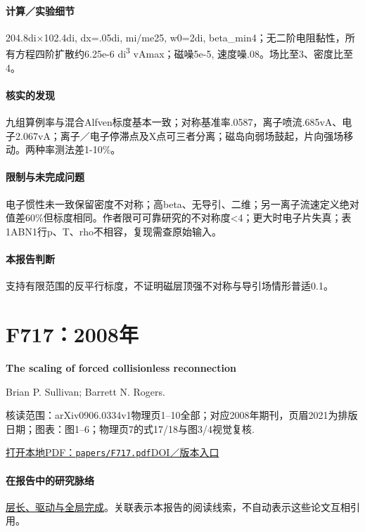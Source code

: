 \documentclass[UTF8,a4paper,11pt,openany,fontset=fandol]{ctexbook}
\begin{document}
\paragraph{计算／实验细节}204.8di×102.4di, dx=.05di, mi/me25, w0=2di, beta\_min4；无二阶电阻黏性，所有方程四阶扩散约6.25e-6 di\textsuperscript{3} vAmax；磁噪5e-5, 速度噪.08。场比至3、密度比至4。

\paragraph{核实的发现}九组算例率与混合Alfven标度基本一致；对称基准率.0587，离子喷流.685vA、电子2.067vA；离子／电子停滞点及X点可三者分离；磁岛向弱场鼓起，片向强场移动。两种率测法差1-10\%。

\paragraph{限制与未完成问题}电子惯性未一致保留密度不对称；高beta、无导引、二维；另一离子流速定义绝对值差60\%但标度相同。作者限可可靠研究的不对称度<4；更大时电子片失真；表1ABN1行p、T、rho不相容，复现需查原始输入。

\paragraph{本报告判断}支持有限范围的反平行标度，不证明磁层顶强不对称与导引场情形普适0.1。

\section{F717：2008年}\label{paper:F717}

\textbf{The scaling of forced collisionless reconnection}\citep{F717}\

Brian P. Sullivan;  Barrett N. Rogers.

\textsf{核读范围：}arXiv0906.0334v1物理页1–10全部；对应2008年期刊，页眉2021为排版日期；\textsf{图表：}图1–6；物理页7的式17/18与图3/4视觉复核.

\href{run:../papers/F717.pdf}{打开本地PDF：\texttt{papers/F717.pdf}}\quad\href{https://doi.org/10.1063/1.2992136}{DOI／版本入口}

\paragraph{在报告中的研究脉络}\hyperref[story:global]{层长、驱动与全局完成}。关联表示本报告的阅读线索，不自动表示这些论文互相引用。
\end{document}
